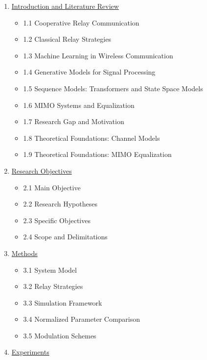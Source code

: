 \documentclass[
  english,
  12pt,
  12pt,
  a4paper,
  oneside]{report}
\providecommand{\tightlist}{%
  \setlength{\itemsep}{0pt}\setlength{\parskip}{0pt}}
\begin{document}
\begin{enumerate}
\def\labelenumi{\arabic{enumi}.}
\tightlist
\item
  \hyperref[introduction-and-literature-review]{Introduction and Literature Review}

  \begin{itemize}
  \tightlist
  \item
    1.1 Cooperative Relay Communication
  \item
    1.2 Classical Relay Strategies
  \item
    1.3 Machine Learning in Wireless Communication
  \item
    1.4 Generative Models for Signal Processing
  \item
    1.5 Sequence Models: Transformers and State Space Models
  \item
    1.6 MIMO Systems and Equalization
  \item
    1.7 Research Gap and Motivation
  \item
    1.8 Theoretical Foundations: Channel Models
  \item
    1.9 Theoretical Foundations: MIMO Equalization
  \end{itemize}
\item
  \hyperref[research-objectives]{Research Objectives}

  \begin{itemize}
  \tightlist
  \item
    2.1 Main Objective
  \item
    2.2 Research Hypotheses
  \item
    2.3 Specific Objectives
  \item
    2.4 Scope and Delimitations
  \end{itemize}
\item
  \hyperref[methods]{Methods}

  \begin{itemize}
  \tightlist
  \item
    3.1 System Model
  \item
    3.2 Relay Strategies
  \item
    3.3 Simulation Framework
  \item
    3.4 Normalized Parameter Comparison
  \item
    3.5 Modulation Schemes
  \end{itemize}
\item
  \hyperref[experiments]{Experiments}


\end{enumerate}
\end{document}
